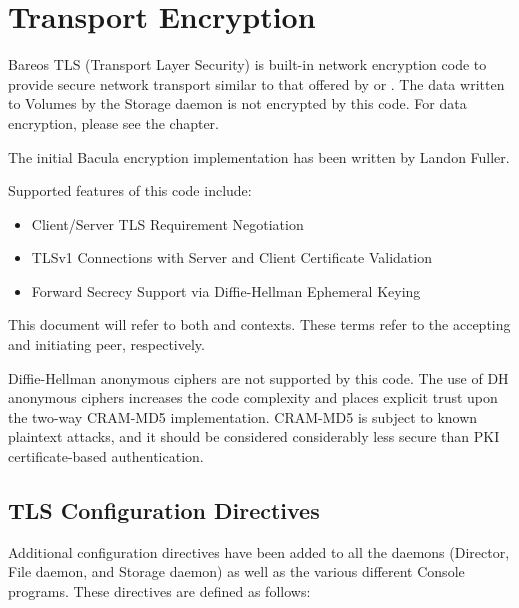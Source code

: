 
\chapter{Transport Encryption}
\label{CommEncryption}
\label{sec:TransportEncryption}

Bareos TLS (Transport Layer Security) is built-in network
encryption code to provide secure network transport similar to
that offered by  or .  The data written to
Volumes by the Storage daemon is not encrypted by this code.
For data encryption, please see the  chapter.

The initial Bacula encryption implementation has been written by Landon Fuller.

Supported features of this code include:
\begin{itemize}
\item Client/Server TLS Requirement Negotiation
\item TLSv1 Connections with Server and Client Certificate
Validation
\item Forward Secrecy Support via Diffie-Hellman Ephemeral Keying
\end{itemize}

This document will refer to both  and  contexts.
These terms refer to the accepting and initiating peer, respectively.

Diffie-Hellman anonymous ciphers are not supported by this code.  The
use of DH anonymous ciphers increases the code complexity and places
explicit trust upon the two-way CRAM-MD5 implementation.  CRAM-MD5 is
subject to known plaintext attacks, and it should be considered
considerably less secure than PKI certificate-based authentication.

\section{TLS Configuration Directives}
\label{TlsDirectives}
Additional configuration directives have been added to all the daemons
(Director, File daemon, and Storage daemon) as well as the various
different Console programs.
These directives are defined as follows:


